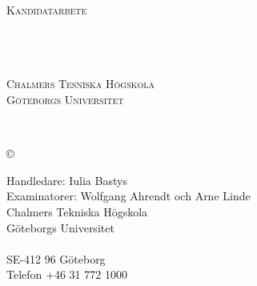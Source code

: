 \newpage
\thispagestyle{empty}
\begin{center}

	\textsc{\large Kandidatarbete \the\year }\\[4cm]

	\textbf{\Large \ambaTitle} \\[1cm]

    {\linespread{1.2}\large
        \StrSubstitute{\ambaAuthors}{,}{\\}
        \\ %
    }

	\vfill

	\ambaDepartmentSwedish \\
	\textsc{Chalmers Tesniska Högskola} \\
	\textsc{Göteborgs Universitet} \\
	\ambaCityCountryYearSwedish
\end{center}


\newpage
{\ambaTitle}\\
\textsc{\ambaAuthors}
\setlength{\parskip}{0.5cm}

\copyright{~\textsc{\ambaAuthors \the\year}}
\setlength{\parskip}{1cm}

Handledare: Iulia Bastys \\
Examinatorer: Wolfgang Ahrendt och Arne Linde \\[1cm]

Chalmers Tekniska Högskola\\
Göteborgs Universitet\\
\ambaDepartmentSwedish \\
SE-412 96 Göteborg\\
Telefon +46 31 772 1000 \setlength{\parskip}{0.5cm}

\vfill
\ambaCityCountryYearSwedish
